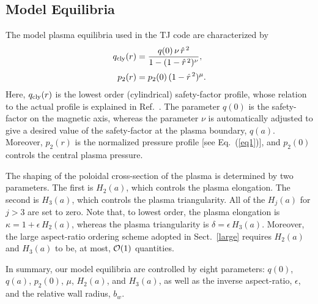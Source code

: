 \documentclass[12pt,prb,aps]{revtex4-1}
\begin{document}
\subsection{Model Equilibria}
The model plasma equilibria used in the TJ code are characterized by
\begin{align}
q_{\rm cly}(r) &= \frac{q(0)\,\nu\,\hat{r}^{\,2}}{1-(1-\hat{r}^{\,2})^\nu},\\[0.5ex]
p_2(r)&=p_2(0)\,(1-\hat{r}^{\,2})^\mu.
\end{align}
Here, $q_{\rm cly}(r)$ is the lowest order (cylindrical) safety-factor profile, whose relation to the actual profile is explained in Ref.~. The parameter $q(0)$ is the
safety-factor on the magnetic axis, whereas the parameter $\nu$ is automatically adjusted to give a desired value of the safety-factor at the plasma boundary, $q(a)$.  
Moreover, $p_2(r)$ is the normalized pressure profile [see Eq.~(\ref{eq1})], and $p_2(0)$ controls the central plasma pressure.
 
 The shaping of the
poloidal cross-section of the plasma is determined by two parameters. The first is  $H_2(a)$, which controls the plasma elongation. The second is $H_3(a)$, which
controls the plasma triangularity. All of the  $H_j(a)$ for $j>3$ are set to zero.
Note that, to lowest order, the plasma elongation is $\kappa=1+\epsilon\,H_2(a)$, whereas the plasma triangularity is $\delta =\epsilon\,H_3(a)$.\cite{eql} Moreover, the large aspect-ratio ordering scheme
adopted in Sect.~\ref{large} requires $H_2(a)$ and $H_3(a)$ to be, at most, ${\cal O}(1)$ quantities. 

In summary, our model equilibria are controlled by eight parameters: $q(0)$, $q(a)$, $p_2(0)$, $\mu$, $H_2(a)$, and $H_3(a)$, as well as the inverse aspect-ratio, $\epsilon$,
and the relative wall radius, $b_w$.  
\end{document}
